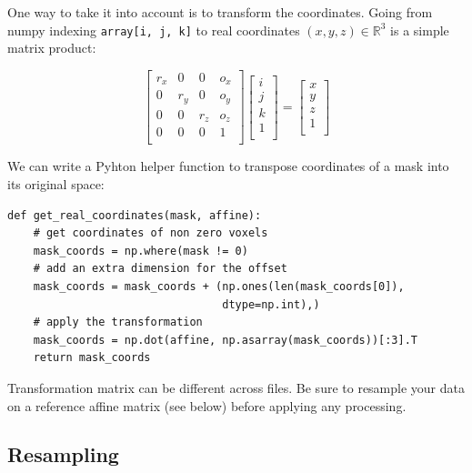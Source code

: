 \documentclass{frontiersSCNS} %
\begin{document}
One way to take it into account is to transform the coordinates. Going from
numpy indexing \verb!array[i, j, k]! to real coordinates $(x, y, z) \in
\mathbb{R}^3$ is a simple matrix product:

\[
    \begin{bmatrix}
        r_x & 0   & 0   & o_x \\
        0   & r_y & 0   & o_y \\
        0   & 0   & r_z & o_z \\
        0   & 0   & 0   & 1   \\
    \end{bmatrix}
    \begin{bmatrix}
        i \\
        j \\
        k \\
        1 \\
    \end{bmatrix}
    =
    \begin{bmatrix}
        x \\
        y \\
        z \\
        1 \\
    \end{bmatrix}
\]

We can write a Pyhton helper function to transpose coordinates of a mask into
its original space:


\begin{lstlisting}
def get_real_coordinates(mask, affine):
    # get coordinates of non zero voxels
    mask_coords = np.where(mask != 0)
    # add an extra dimension for the offset
    mask_coords = mask_coords + (np.ones(len(mask_coords[0]),
                                 dtype=np.int),)
    # apply the transformation
    mask_coords = np.dot(affine, np.asarray(mask_coords))[:3].T
    return mask_coords
\end{lstlisting}

Transformation matrix can be different across files. Be sure to resample your
data on a reference affine matrix (see below) before applying any processing.

\subsection{Resampling}
\label{resampling}
\end{document}

